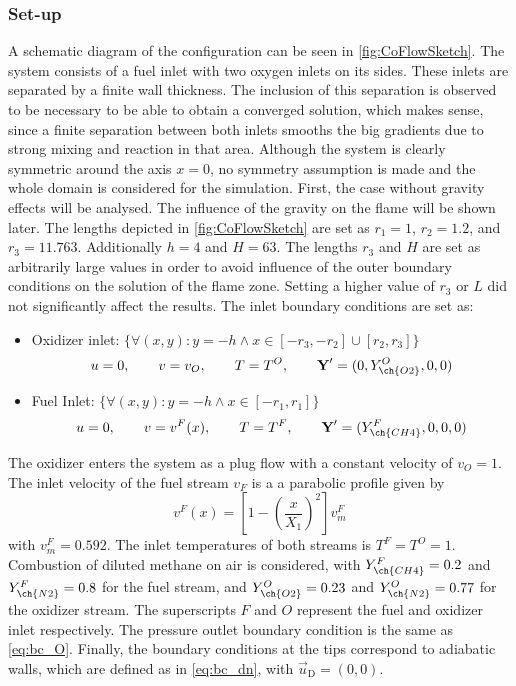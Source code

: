 \subsubsection{Set-up}
A schematic diagram of the configuration can be seen in \cref{fig:CoFlowSketch}. The system consists of a fuel inlet with two oxygen inlets on its sides. These inlets are separated by a finite wall thickness. The inclusion of this separation is observed to be necessary to be able to obtain a converged solution, which makes sense, since a finite separation between both inlets smooths the big gradients due to strong mixing and reaction in that area. Although the system is clearly symmetric around the axis $x = 0$, no symmetry assumption is made and the whole domain is considered for the simulation. First, the case without gravity effects will be analysed. The influence of the gravity on the flame will be shown later.
The lengths depicted in \cref{fig:CoFlowSketch} are set as $ r_1 = 1$, $ r_2 = 1.2$, and $ r_3 = 11.763$. Additionally $ h = 4$ and $ H = 63$. The lengths $ r_3$ and $H$ are set as arbitrarily large values in order to avoid influence of the outer boundary conditions on the solution of the flame zone. Setting a higher value of $ r_3$ or $ L$ did not significantly affect the results. The inlet boundary conditions are set as: 
\begin{itemize}
	\item Oxidizer inlet: $\{\forall (x,y): y = -h \land x \in [-r_3,-r_2]\cup[r_2,r_3]\}$\\
	\begin{equation*}
		u = 0,\qquad v= v_O, \qquad T = T^O, \qquad \vec{Y}' = (0,Y^O_{\ch{O2}},0,0)
	\end{equation*}
\item Fuel Inlet: $\{\forall (x,y): y = -h \land x \in [-r_1,r_1]\} $ \\
\begin{equation*}
	u = 0,\qquad v= v^F(x), \qquad T = T^F, \qquad \vec{Y}' = (Y^F_{\ch{CH4}},0,0,0)
\end{equation*}
\end{itemize}
The oxidizer enters the system as a plug flow with a constant velocity of $v_O = 1 $. The inlet velocity of the fuel stream $v_F$ is a a parabolic profile given by
\begin{equation}
	v^F(x) = \left[1-\left(\frac{x}{X_1}\right)^2\right]v_m^F
\end{equation}
with $v^F_m =0.592$.  The inlet temperatures of both streams is  $T^F = T^O = 1$. Combustion of diluted methane on air is considered, with $Y^F_{\ch{CH4}} = 0.2$ and $Y^F_{\ch{N2}} = 0.8$ for the fuel stream, and  $Y^O_{\ch{O2}} = 0.23$ and $Y^O_{\ch{N2}} = 0.77$ for the oxidizer stream. The superscripts $F$ and $O$ represent the fuel and oxidizer inlet respectively. The pressure outlet boundary condition is the same as \cref{eq:bc_O}. Finally, the boundary conditions at the tips correspond to adiabatic walls, which are defined as in \cref{eq:bc_dn}, with $\vec{u}_{\text{D}} = (0,0)$.             

